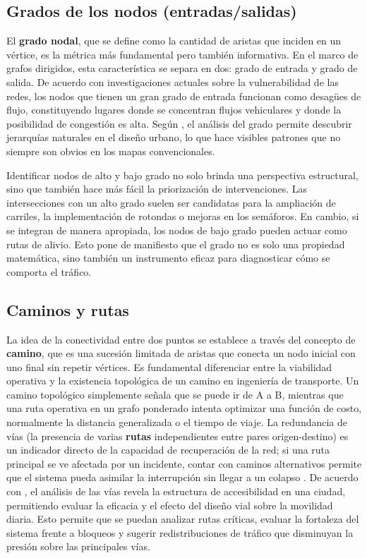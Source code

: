 \subsection{Grados de los nodos (entradas/salidas)}
El \textbf{grado nodal}, que se define como la cantidad de aristas que inciden en un vértice, es la métrica más fundamental pero también informativa. En el marco de grafos dirigidos, 
esta característica se separa en dos: grado de entrada y grado de salida. De acuerdo con investigaciones actuales sobre la vulnerabilidad de las redes, los nodos que tienen un 
gran grado de entrada funcionan como desagües de flujo, constituyendo lugares donde se concentran flujos vehiculares y donde la posibilidad de congestión es alta. Según 
\cite{porta_network_2004}, el análisis del grado permite descubrir jerarquías naturales en el diseño urbano, lo que hace visibles patrones que no siempre son obvios en los 
mapas convencionales.

Identificar nodos de alto y bajo grado no solo brinda una perspectiva estructural, sino que también hace más fácil la priorización de intervenciones. Las intersecciones con un 
alto grado suelen ser candidatas para la ampliación de carriles, la implementación de rotondas o mejoras en los semáforos. En cambio, si se integran de manera apropiada, los 
nodos de bajo grado pueden actuar como rutas de alivio. Esto pone de manifiesto que el grado no es solo una propiedad matemática, sino también un instrumento eficaz para 
diagnosticar cómo se comporta el tráfico.

\subsection{Caminos y rutas}
La idea de la conectividad entre dos puntos se establece a través del concepto de \textbf{camino}, que es una sucesión limitada de aristas que conecta un nodo inicial con uno final sin 
repetir vértices. Es fundamental diferenciar entre la viabilidad operativa y la existencia topológica de un camino en ingeniería de transporte. Un camino topológico simplemente 
señala que se puede ir de A a B, mientras que una ruta operativa en un grafo ponderado intenta optimizar una función de costo, normalmente la distancia generalizada o el 
tiempo de viaje. La redundancia de vías (la presencia de varias \textbf{rutas} independientes entre pares origen-destino) es un indicador directo de la capacidad de recuperación de la 
red; si una ruta principal se ve afectada por un incidente, contar con caminos alternativos permite que el sistema pueda asimilar la interrupción sin llegar a un 
colapso \cite{guze_graph_2019}. De acuerdo con \cite{barthelemy_spatial_2011}, el análisis de las vías revela la estructura de accesibilidad en una ciudad, permitiendo evaluar la eficacia y el efecto del 
diseño vial sobre la movilidad diaria. Esto permite que se puedan analizar rutas críticas, evaluar la fortaleza del sistema frente a bloqueos y sugerir redistribuciones de 
tráfico que disminuyan la presión sobre las principales vías.

